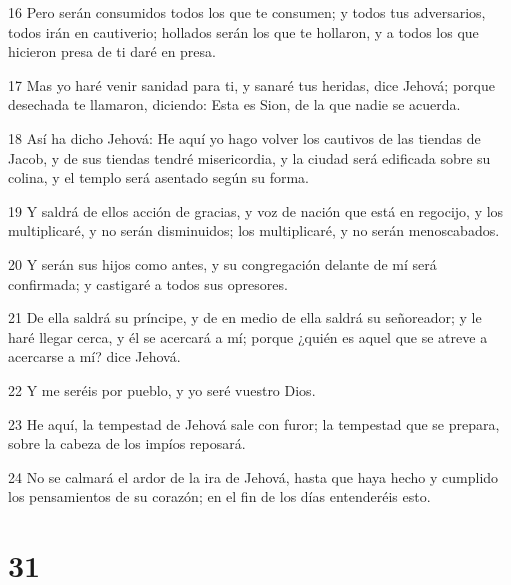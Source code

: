\par 16 Pero serán consumidos todos los que te consumen; y todos tus adversarios, todos irán en cautiverio; hollados serán los que te hollaron, y a todos los que hicieron presa de ti daré en presa.
\par 17 Mas yo haré venir sanidad para ti, y sanaré tus heridas, dice Jehová; porque desechada te llamaron, diciendo: Esta es Sion, de la que nadie se acuerda.
\par 18 Así ha dicho Jehová: He aquí yo hago volver los cautivos de las tiendas de Jacob, y de sus tiendas tendré misericordia, y la ciudad será edificada sobre su colina, y el templo será asentado según su forma.
\par 19 Y saldrá de ellos acción de gracias, y voz de nación que está en regocijo, y los multiplicaré, y no serán disminuidos; los multiplicaré, y no serán menoscabados.
\par 20 Y serán sus hijos como antes, y su congregación delante de mí será confirmada; y castigaré a todos sus opresores.
\par 21 De ella saldrá su príncipe, y de en medio de ella saldrá su señoreador; y le haré llegar cerca, y él se acercará a mí; porque ¿quién es aquel que se atreve a acercarse a mí? dice Jehová.
\par 22 Y me seréis por pueblo, y yo seré vuestro Dios.
\par 23 He aquí, la tempestad de Jehová sale con furor; la tempestad que se prepara, sobre la cabeza de los impíos reposará.
\par 24 No se calmará el ardor de la ira de Jehová, hasta que haya hecho y cumplido los pensamientos de su corazón; en el fin de los días entenderéis esto.

\chapter{31}

